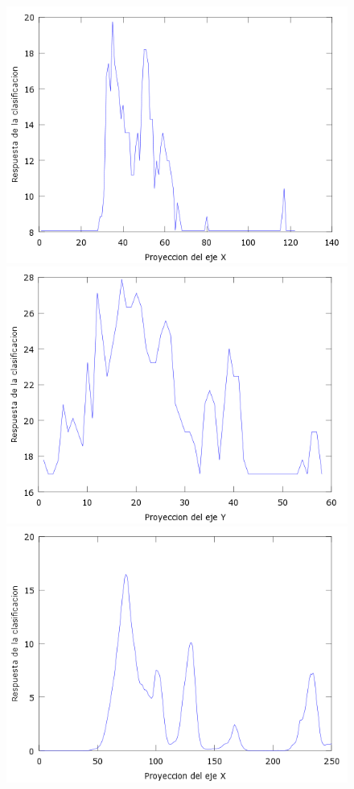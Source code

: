 \begin{figure}[H]
  \centering
  \includegraphics[scale=.4]{images/plots/boost5X}
  \includegraphics[scale=.4]{images/plots/boost5Y}
  \includegraphics[scale=.4]{images/plots/svm5X}

\end{figure}
